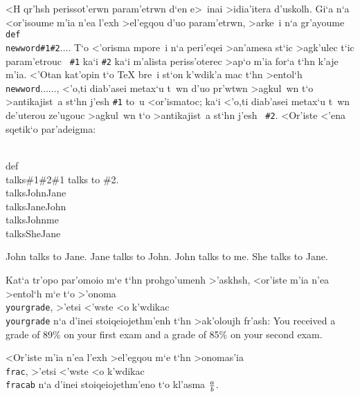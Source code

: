 <H qr'hsh perissot'erwn param'etrwn d`en e>~inai >idia'itera d'uskolh.  
 Gi`a n`a <or'isoume m'ia n'ea l'exh >el'egqou d'uo param'etrwn, >arke~i
n`a    gr'ayoume {\tt \\def\\newword\#1\#2\lb$\ldots$\rb}. T`o <'orisma
mpore~i n`a peri'eqei >an'amesa st`ic >agk'ulec t`ic param'etrouc {\tt  
 \#1} ka`i {\tt \#2} ka`i m'alista periss'oterec >ap`o m'ia for`a t`hn
k'aje m'ia.  <'Otan kat'opin t`o {\rm \TeX} bre~i st`on k'wdik'a mac
t`hn >entol`h {\tt \\newword\lb$\ldots$\rb\lb$\ldots$\rb}, <'o,ti
diab'asei metax`u t~wn d'uo pr'wtwn >agkul~wn t`o >antikajist~a st`hn
j'esh {\tt \#1} to~u <or'ismatoc; ka`i <'o,ti diab'asei metax`u t~wn
de'uterou ze'ugouc >agkul~wn t`o >anti\-ka\-ji\-st~a st`hn j'esh {\tt
\#2}\null. <Or'iste <'ena sqetik`o par'adeigma:

\beginuser
\\def\\talks\#1\#2\lb \#1 talks to \#2.\rb
\\talks\lb John\rb\lb Jane\rb
\\talks\lb Jane\rb\lb John\rb
\\talks\lb John\rb\lb me\rb
\\talks\lb She\rb\lb Jane\rb
\enduser

\def\talks#1#2{{\rm #1 talks to #2.}}
\talks{John}{Jane}
\talks{Jane}{John}
\talks{John}{me}
\talks{She}{Jane}
  
\exercise Kat`a tr'opo par'omoio m`e t`hn prohgo'umenh >'askhsh,
<or'iste m'ia n'ea >entol`h m`e t`o >'onoma {\tt\\yourgrade}, >'etsi
<'wste <o k'wdikac {\tt \\yourgrade{}\rb{}\rb} n`a d'inei
stoiqeiojethm'enh t`hn >ak'oloujh fr'ash: {\rm You received a grade of
89\% on your first exam and a grade of 85\% on your second exam}. 

\exercise <Or'iste m'ia n'ea l'exh >el'egqou m`e t`hn >onomas'ia {\tt
\\frac}, >'etsi <'wste <o k'wdikac {\tt \\frac\lb a\rb\lb b\rb} n`a
d'inei stoiqeiojethm'eno t`o kl'asma ${a\over b}$.
\bigskip 


